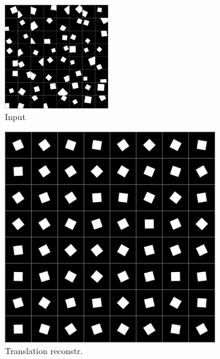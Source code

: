 \documentclass[10pt,a4paper]{article}
\begin{document}
\begin{figure}[!ht]
\centering
\begin{subfigure}{\textwidth}
	\centering
	\includegraphics[width=0.49\textwidth] {square_input.png}
	\caption{Input}
	\label{sq_in}
\end{subfigure}
\begin{subfigure}{0.49\textwidth}
	\centering
	\includegraphics[width=\textwidth] {square_output0.png}
	\caption{Translation reconstr.}
	\label{sq_trec}
\end{subfigure}
\begin{subfigure}{0.49\textwidth}
	\centering	

\end{subfigure}
\end{figure}
\end{document}
